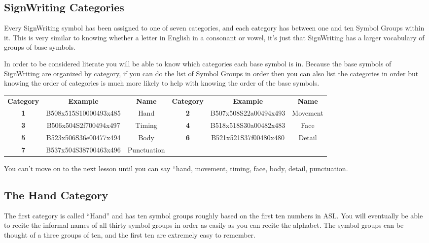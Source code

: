 \documentclass{article}
\begin{document}
\subsection{SignWriting Categories}

Every SignWriting symbol has been assigned to one of seven categories, and each category has between one and ten Symbol Groups within it.
This is very similar to knowing whether a letter in English in a consonant or vowel, it's just that SignWriting has a larger vocabulary of groups of base symbols.

In order to be considered literate you will be able to know which categories each base symbol is in.
Because the base symbols of SignWriting are organized by category, if you can do the list of Symbol Groups in order then you can also list the categories in order but knowing the order of categories is much more likely to help with knowing the order of the base symbols.

\begin{center}
\begin{tabular}{ccc@{\hskip 2cm}ccc}
\textbf{Category}&\textbf{Example}&\textbf{Name}&\textbf{Category}&\textbf{Example}&\textbf{Name}\\
\textbf{1}&B508x515S10000493x485&Hand       &\textbf{2}&B507x508S22a00494x493&Movement\\
\textbf{3}&B506x504S2f700494x497&Timing     &\textbf{4}&B518x518S30a00482x483&Face    \\
\textbf{5}&B523x506S36e00477x494&Body       &\textbf{6}&B521x521S37f00480x480&Detail  \\
\textbf{7}&B537x504S38700463x496&Punctuation\\
\end{tabular}
\end{center}

You can't move on to the next lesson until you can say ``hand, movement, timing, face, body, detail, punctuation.

\subsection{The Hand Category}

The first category is called ``Hand'' and has ten symbol groups roughly based on the first ten numbers in ASL.
You will eventually be able to recite the informal names of all thirty symbol groups in order as easily as you can recite the alphabet.
The symbol groups can be thought of a three groups of ten, and the first ten are extremely easy to remember.
\end{document}
